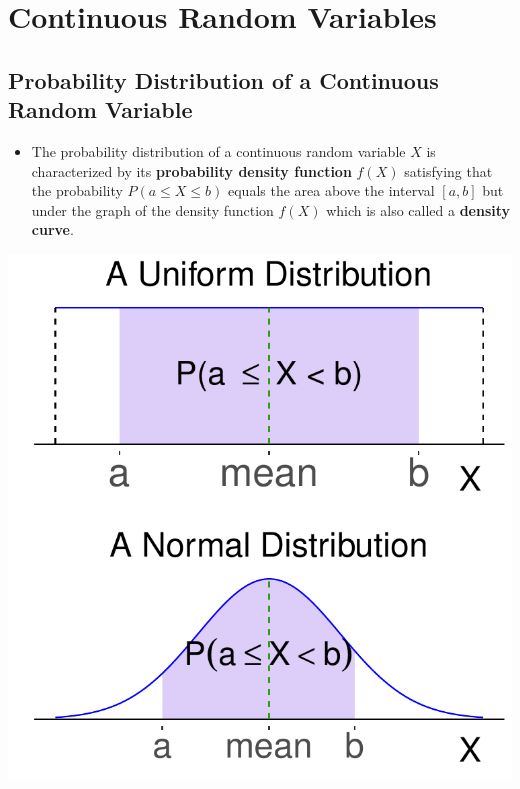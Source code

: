 
\section{Continuous Random Variables}

\hypertarget{probability-distribution-of-a-continuous-random-variable}{%
\subsection{Probability Distribution of a Continuous Random
Variable}\label{probability-distribution-of-a-continuous-random-variable}}

\begin{itemize}
\item
  The probability distribution of a continuous random variable \(X\) is
  characterized by its \textbf{probability density function} \(f(X)\)
  satisfying that the probability \(P(a\leq X\leq b)\) equals the area
  above the interval \([a, b]\) but under the graph of the density
  function \(f(X)\) which is also called a \textbf{density curve}.
\end{itemize}

\begin{fullwidth}
  \colorbox{white}{
    \parbox{\linewidth}{
      \begin{multicols*}{2}
        \includegraphics[width=0.8\linewidth]{figure-latex/unnamed-chunk-8-2-1}
        
        \columnbreak

        \includegraphics[width=0.8\linewidth]{figure-latex/unnamed-chunk-8-3-1}
      \end{multicols*}
    }}
\end{fullwidth}

